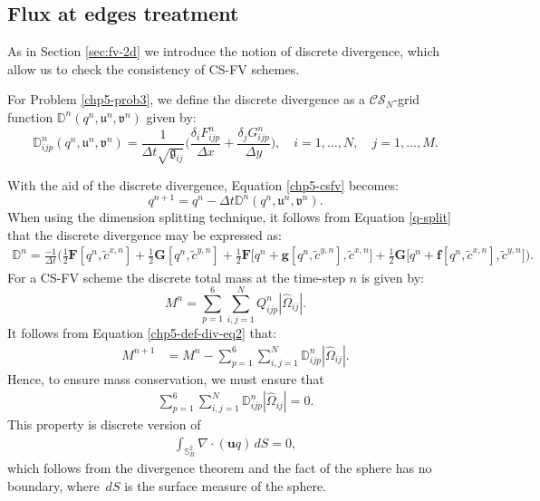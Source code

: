 \subsection{Flux at edges treatment}
As in Section \ref{sec:fv-2d}  we introduce the notion of discrete divergence,
which allow us to check the consistency of CS-FV schemes.
\begin{definition}
	\label{chp5-def-div}
	For Problem \ref{chp5-prob3}, we define the discrete divergence as a 
	$\mathcal{CS}_N$-grid function $\mathbb{D}^n(q^n,\mathfrak{u}^n,\mathfrak{v}^n)$
	given by:
	\begin{equation}
		\label{chp5-def-div-eq}
		\mathbb{D}_{ijp}^n(q^n,\mathfrak{u}^n,\mathfrak{v}^n)=  \frac{1}{\Delta t \sqrt{\mathfrak{g}_{ij}}}
		\bigg(\frac{\delta_i {F}_{ijp}^{n}}{\Delta x} + \frac{\delta_j {G}_{ijp}^{n}}{\Delta y}\bigg), 
		\quad i = 1, \ldots, N, \quad j=1, \ldots,M.
	\end{equation}
\end{definition}
With the aid of the discrete divergence, Equation \eqref{chp5-csfv} becomes:
\begin{equation}
	\label{chp5-def-div-eq2}
	q^{n+1} = q^n - \Delta t \mathbb{D}^n(q^n,\mathfrak{u}^n,\mathfrak{v}^n).
\end{equation}
When using the dimension splitting technique, it follows from Equation \eqref{q-split} that 
the discrete divergence may be expressed as:
\begin{align}
	\label{eqdiv-split}
	\mathbb{D}^n = \frac{-1}{\Delta t}\bigg(
 \frac{1}{2}\mathbf{F}[q^n,\tilde{c}^{x,n}] +\frac{1}{2}\mathbf{G}[q^n,\tilde{c}^{y,n}]
+\frac{1}{2}\mathbf{F}\bigg[q^n + \mathbf{g}[q^n, \tilde{c}^{y,n}], \tilde{c}^{x,n}\bigg]
+\frac{1}{2}\mathbf{G}\bigg[q^n + \mathbf{f}[q^n, \tilde{c}^{x,n}], \tilde{c}^{y,n}\bigg]\bigg).
\end{align}
For a CS-FV scheme the discrete total mass at the time-step $n$ is given by:
\begin{equation*}
	M^n =\sum_{p=1}^6 \sum_{i,j=1}^N Q_{ijp}^n |\hat{\Omega}_{ij}|.
\end{equation*}
It follows from Equation \eqref{chp5-def-div-eq2} that:
\begin{align*}
	M^{n+1} &= M^n  - \sum_{p=1}^6 \sum_{i,j=1}^N \mathbb{D}_{ijp}^{n} |\hat{\Omega}_{ij}|.
\end{align*}
Hence, to ensure mass conservation, we must ensure that
\begin{align*}
	\sum_{p=1}^6 \sum_{i,j=1}^N   \mathbb{D}_{ijp}^{n} |\hat{\Omega}_{ij}| = 0.
\end{align*}
This property is discrete version of
\begin{align*}
	\int_{\mathbb{S}^2_R} \nabla \cdot (\boldsymbol{u}q) \,dS = 0,
\end{align*}
which follows from the divergence theorem and the fact of the sphere has no boundary, where $\,dS$ is the surface measure of the sphere.


